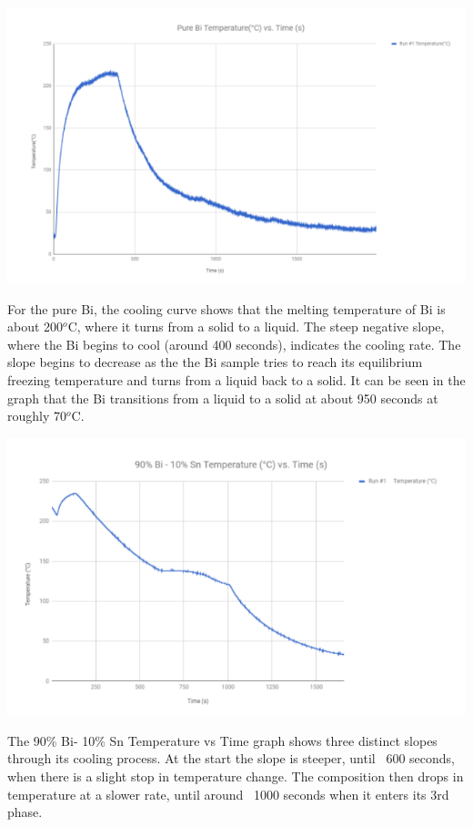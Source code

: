 \documentclass{article}
\begin{document}
\begin{center}
\includegraphics[width=400pt]{PureBi_Graph.png}
\end{center}
For the pure Bi, the cooling curve shows that the melting temperature of Bi is about 200$^o$C, where it turns from a solid to a liquid. The steep negative slope, where the Bi begins to cool (around 400 seconds), indicates the cooling rate. The slope begins to decrease as the the Bi sample tries to reach its equilibrium freezing temperature and turns from a liquid back to a solid. It can be seen in the graph that the Bi transitions from a liquid to a solid at about 950 seconds at roughly 70$^o$C. 



\begin{center}
\includegraphics[width=400pt]{90Bi10Sn_Graph.png}
\end{center}
The 90\% Bi- 10\% Sn Temperature vs Time graph shows three distinct slopes through its cooling process. At the start the slope is steeper, until ~600 seconds, when there is a  slight stop in temperature change. The composition then drops in temperature at a slower rate, until around ~1000 seconds when it enters its 3rd phase.  
\end{document}
